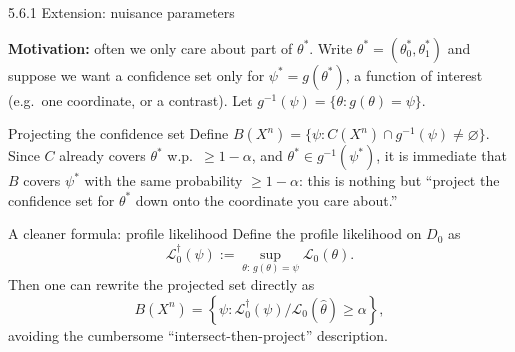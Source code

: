 \documentclass[aspectratio=169,10pt]{beamer}
\begin{document}
\begin{frame}{5.6.1 Extension: nuisance parameters}

  \textbf{Motivation:} often we only care about part of $\theta^*$.
  Write $\theta^* = (\theta_0^*, \theta_1^*)$ and suppose we want a
  confidence set only for $\psi^* = g(\theta^*)$, a function of
  interest (e.g.\ one coordinate, or a contrast). Let
  $g^{-1}(\psi) = \{\theta : g(\theta)=\psi\}$.

  \begin{block}{Projecting the confidence set}
    Define $B(X^n) = \{\psi : C(X^n) \cap g^{-1}(\psi) \neq \varnothing\}$.
    Since $C$ already covers $\theta^*$ w.p.\ $\ge 1-\alpha$, and
    $\theta^* \in g^{-1}(\psi^*)$, it is immediate that $B$ covers
    $\psi^*$ with the same probability $\ge 1-\alpha$: this is nothing
    but ``project the confidence set for $\theta^*$ down onto the
    coordinate you care about.''
  \end{block}

  \begin{block}{A cleaner formula: profile likelihood}
    Define the profile likelihood on $D_0$ as
    $$ \mathcal{L}_0^\dagger(\psi) := \sup_{\theta:\, g(\theta)=\psi} \mathcal{L}_0(\theta). $$
    Then one can rewrite the projected set directly as
    $$ B(X^n) = \left\{\psi : \mathcal{L}_0^\dagger(\psi)/\mathcal{L}_0(\hat\theta) \ge \alpha\right\}, $$
    avoiding the cumbersome ``intersect-then-project'' description.
  \end{block}

\end{frame}
\end{document}
